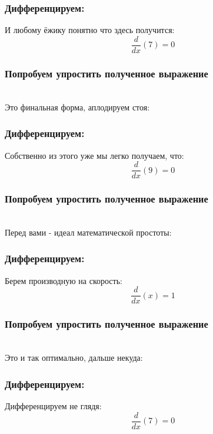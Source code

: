 \documentclass[a4paper,12pt]{article}
\begin{document}
\subsubsection*{Дифференцируем:}

И любому ёжику понятно что здесь получится:
\begin{dmath}\frac{d}{dx}\left(7\right)=0\end{dmath}
\subsubsection*{Попробуем упростить полученное выражение}
\\Это финальная форма, аплодируем стоя:

\subsubsection*{Дифференцируем:}

Собственно из этого уже мы легко получаем, что:
\begin{dmath}\frac{d}{dx}\left(9\right)=0\end{dmath}
\subsubsection*{Попробуем упростить полученное выражение}
\\Перед вами - идеал математической простоты:

\subsubsection*{Дифференцируем:}

Берем производную на скорость:
\begin{dmath}\frac{d}{dx}\left(x\right)=1\end{dmath}
\subsubsection*{Попробуем упростить полученное выражение}
\\Это и так оптимально, дальше некуда:

\subsubsection*{Дифференцируем:}

Дифференцируем не глядя:
\begin{dmath}\frac{d}{dx}\left(7\right)=0\end{dmath}
\end{document}
